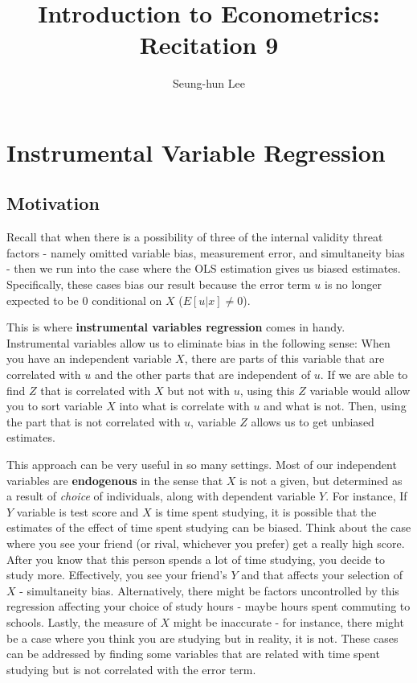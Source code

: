 \documentclass[12pt]{article}
\title{Introduction to Econometrics: Recitation 9}
\theoremstyle{definition}
\theoremstyle{property}
\theoremstyle{assumption}
\theoremstyle{example}
\theoremstyle{comment}
\begin{document}
\linespread{1.25}
\author{Seung-hun Lee}
\date{}
\maketitle
\section{Instrumental Variable Regression}
\subsection{Motivation}
Recall that when there is a possibility of three of the internal validity threat factors - namely omitted variable bias, measurement error, and simultaneity bias - then we run into the case where the OLS estimation gives us biased estimates. Specifically, these cases bias our result because the error term $u$ is no longer expected to be 0 conditional on $X$ ($E[u|x]\neq 0$). \par\medskip

This is where \textbf{instrumental variables regression} comes in handy. Instrumental variables allow us to eliminate bias in the following sense: When you have an independent variable $X$, there are parts of this variable that are correlated with $u$ and the other parts that are independent of $u$. If we are able to find $Z$ that is correlated with $X$ but not with $u$, using this $Z$ variable would allow you to sort variable $X$ into what is correlate with $u$ and what is not. Then, using the part that is not correlated with $u$, variable $Z$ allows us to get unbiased estimates. \par\medskip

This approach can be very useful in so many settings. Most of our independent variables are \textbf{endogenous} in the sense that $X$ is not a given, but determined as a result of \textit{choice} of individuals, along with dependent variable $Y$. For instance, If $Y$ variable is test score and $X$ is time spent studying, it is possible that the estimates of the effect of time spent studying can be biased. Think about the case where you see your friend (or rival, whichever you prefer) get a really high score. After you know that this person spends a lot of time studying, you decide to study more. Effectively, you see your friend's $Y$ and that affects your selection of $X$ - simultaneity bias. Alternatively, there might be factors uncontrolled by this regression affecting your choice of study hours  - maybe hours spent commuting to schools. Lastly, the measure of $X$ might be inaccurate - for instance, there might be a case where you think you are studying but in reality, it is not. These cases can be addressed by finding some variables that are related with time spent studying but is not correlated with the error term. 
\end{document}
